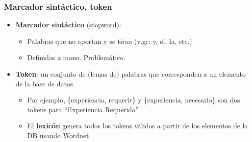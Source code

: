 \begin{frame}[<+->]
  \frametitle{Marcador sintáctico, token}
   \begin{itemize}
      \item \textbf{Marcador sintáctico} (stopword):
      \begin{itemize}
        \item Palabras que no aportan y se tiran (v.gr: y, el, la, etc.)
        \item Definidas a mano. Problemático.
      \end{itemize}

          \item \textbf{Token}: un conjunto de (lemas de) palabras que corresponden a un elemento de la base de datos.
      \begin{itemize}
            \item Por ejemplo, \{experiencia, requerir\} y \{experiencia, necesario\} son dos tokens para ``Experiencia Requerida''
            \item El {\color{red}\textbf{lexicón}} genera todos los tokens válidos a partir de los elementos de la DB usando Wordnet
      \end{itemize}

    \end{itemize}
\end{frame}


